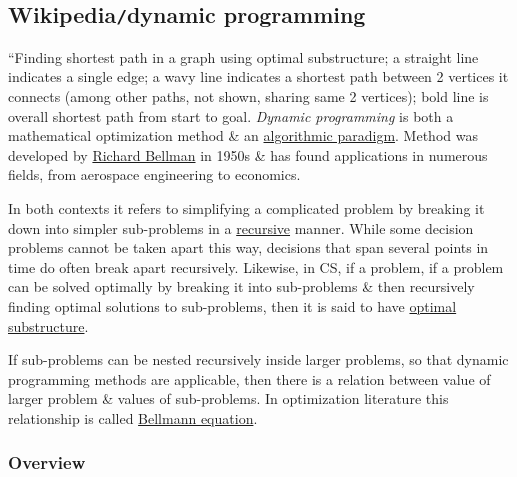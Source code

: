 \documentclass{article}
\begin{document}

\subsection{Wikipedia{\tt/}dynamic programming}
``{\sf Finding shortest path in a graph using optimal substructure; a straight line indicates a single edge; a wavy line indicates a shortest path between 2 vertices it connects (among other paths, not shown, sharing same 2 vertices); bold line is overall shortest path from start to goal.} {\it Dynamic programming} is both a mathematical optimization method \& an \href{https://en.wikipedia.org/wiki/Algorithmic_paradigm}{algorithmic paradigm}. Method was developed by \href{https://en.wikipedia.org/wiki/Richard_Bellman}{\sc Richard Bellman} in 1950s \& has found applications in numerous fields, from aerospace engineering to economics.

In both contexts it refers to simplifying a complicated problem by breaking it down into simpler sub-problems in a \href{https://en.wikipedia.org/wiki/Recursion}{recursive} manner. While some decision problems cannot be taken apart this way, decisions that span several points in  time do often break apart recursively. Likewise, in CS, if a problem, if a problem can be solved optimally by breaking it into sub-problems \& then recursively finding optimal solutions to sub-problems, then it is said to have \href{https://en.wikipedia.org/wiki/Optimal_substructure}{optimal substructure}.

If sub-problems can be nested recursively inside larger problems, so that dynamic programming methods are applicable, then there is a relation between value of larger problem \& values of sub-problems. In optimization literature this relationship is called \href{https://en.wikipedia.org/wiki/Bellman_equation}{Bellmann equation}.

\subsubsection{Overview}
\end{document}
